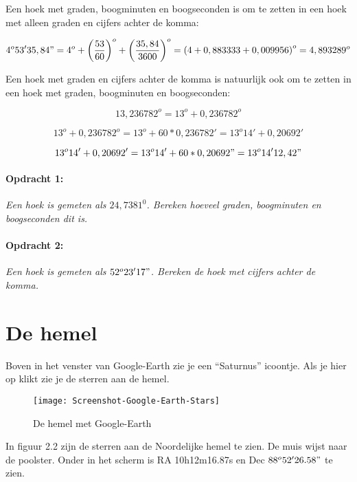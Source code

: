 Een hoek met graden, boogminuten en boogseconden is om te zetten in
een hoek met alleen graden en cijfers achter de komma:

\[
4^{o}53'35,84"=4^{o}+\left(\frac{53}{60}\right)^{o}+\left(\frac{35,84}{3600}\right)^{o}
=\left(4+0,883333+0,009956\right)^{o}=4,893289^{o}
\]


Een hoek met graden en cijfers achter de komma is natuurlijk ook om
te zetten in een hoek met graden, boogminuten en boogseconden:

\[
13,236782^{o}=13^{o}+0,236782^{o}
\]


\[
13^{o}+0,236782^{o}=13^{o}+60*0,236782'=13^{o}14'+0,20692'
\]


\[
13^{o}14'+0,20692'=13^{o}14'+60*0,20692"=13^{o}14'12,42"
\]



\paragraph*{Opdracht 1:}

\emph{Een hoek is gemeten als $24,7381^{0}$. Bereken hoeveel graden,
boogminuten en boogseconden dit is.}


\paragraph*{Opdracht 2:}

\emph{Een hoek is gemeten als $52^{o}23'17"$. Bereken de hoek met
cijfers achter de komma.}


\section{De hemel}

Boven in het venster van Google-Earth zie je een ``Saturnus'' icoontje.
Als je hier op klikt zie je de sterren aan de hemel.

\begin{figure}[H]
\noindent \begin{centering}
\texttt{[image: Screenshot-Google-Earth-Stars]}
\par\end{centering}

\caption{De hemel met Google-Earth}
\end{figure}


In figuur 2.2 zijn de sterren aan de Noordelijke hemel te zien. De
muis wijst naar de poolster. Onder in het scherm is RA 10h12m16.87s
en Dec $88^{o}52'26.58"$ te zien. 

